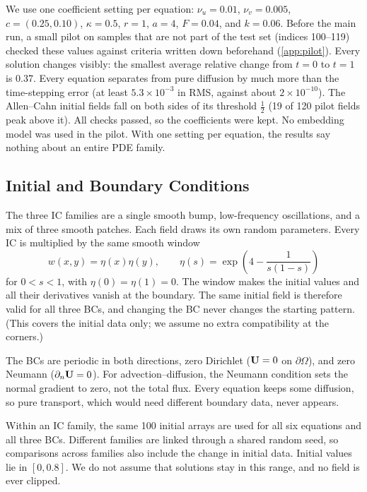 We use one coefficient setting per equation: $\nu_u=0.01$, $\nu_v=0.005$, $c=(0.25,0.10)$, $\kappa=0.5$, $r=1$, $a=4$, $F=0.04$, and $k=0.06$. Before the main run, a small pilot on samples that are not part of the test set (indices 100--119) checked these values against criteria written down beforehand (\cref{app:pilot}). Every solution changes visibly: the smallest average relative change from $t=0$ to $t=1$ is 0.37. Every equation separates from pure diffusion by much more than the time-stepping error (at least $5.3\times10^{-3}$ in RMS, against about $2\times10^{-10}$). The Allen--Cahn initial fields fall on both sides of its threshold $\tfrac12$ (19 of 120 pilot fields peak above it). All checks passed, so the coefficients were kept. No embedding model was used in the pilot. With one setting per equation, the results say nothing about an entire PDE family.

\subsection{Initial and Boundary Conditions}
The three IC families are a single smooth bump, low-frequency oscillations, and a mix of three smooth patches. Each field draws its own random parameters. Every IC is multiplied by the same smooth window
\begin{equation}
 w(x,y)=\eta(x)\eta(y),\qquad
 \eta(s)=\exp\!\left(4-\frac{1}{s(1-s)}\right)
\label{eq:window}
\end{equation}
for $0<s<1$, with $\eta(0)=\eta(1)=0$. The window makes the initial values and all their derivatives vanish at the boundary. The same initial field is therefore valid for all three BCs, and changing the BC never changes the starting pattern. (This covers the initial data only; we assume no extra compatibility at the corners.)

The BCs are periodic in both directions, zero Dirichlet ($\mathbf U=0$ on $\partial\Omega$), and zero Neumann ($\partial_n\mathbf U=0$). For advection--diffusion, the Neumann condition sets the normal gradient to zero, not the total flux. Every equation keeps some diffusion, so pure transport, which would need different boundary data, never appears.

Within an IC family, the same 100 initial arrays are used for all six equations and all three BCs. Different families are linked through a shared random seed, so comparisons across families also include the change in initial data. Initial values lie in $[0,0.8]$. We do not assume that solutions stay in this range, and no field is ever clipped.

